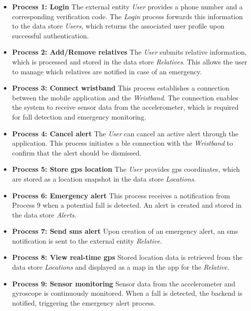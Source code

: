 \begin{itemize}
\item \textbf{Process 1: Login}
The external entity \textit{User} provides a phone number and a corresponding verification code.
The \textit{Login} process forwards this information to the data store \textit{Users}, which returns the associated user profile upon successful authentication.

\item \textbf{Process 2: Add/Remove relatives}
The \textit{User} submits relative information, which is processed and stored in the data store \textit{Relatives}. This allows the user to manage which relatives are notified in case of an emergency.

\item \textbf{Process 3: Connect wristband}
This process establishes a connection between the mobile application and the \textit{Wristband}.
The connection enables the system to receive sensor data from the accelerometer, which is required for fall detection and emergency monitoring.

\item \textbf{Process 4: Cancel alert}
The \textit{User} can cancel an active alert through the application.
This process initiates a \gls{ble} connection with the \textit{Wristband} to confirm that the alert should be dismissed.

\item \textbf{Process 5: Store \gls{gps} location}
The \textit{User} provides \gls{gps} coordinates, which are stored as a location snapshot in the data store \textit{Locations}.

\item \textbf{Process 6: Emergency alert}
This process receives a notification from Process 9 when a potential fall is detected.
An alert is created and stored in the data store \textit{Alerts}.

\item \textbf{Process 7: Send \gls{sms} alert}
Upon creation of an emergency alert, an \gls{sms} notification is sent to the external entity \textit{Relative}.

\item \textbf{Process 8: View real-time \gls{gps}}
Stored location data is retrieved from the data store \textit{Locations} and displayed as a map in the app for the \textit{Relative}.

\item \textbf{Process 9: Sensor monitoring}
Sensor data from the accelerometer and gyroscope is continuously monitored. When a fall is detected, the backend is notified, triggering the emergency alert process.
\end{itemize}

